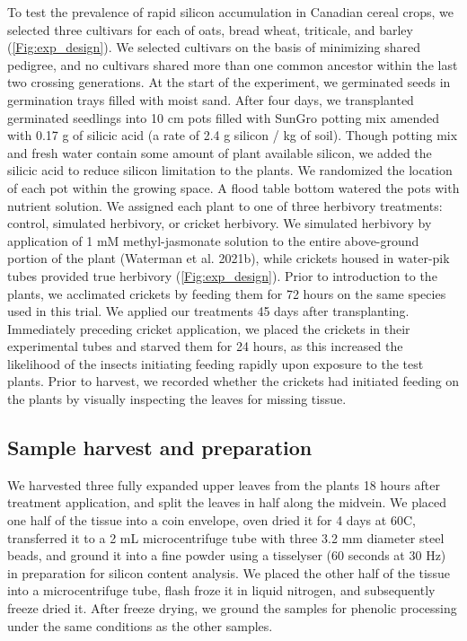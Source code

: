 \documentclass[12pt, letterpaper, ]{report}
\begin{document}
To test the prevalence of rapid silicon accumulation in Canadian cereal crops, we selected three cultivars for each of oats, bread wheat, triticale, and barley (\ref{Fig:exp_design}). We selected cultivars on the basis of minimizing shared pedigree, and no cultivars shared more than one common ancestor within the last two crossing generations. At the start of the experiment, we germinated seeds in germination trays filled with moist sand. After four days, we transplanted germinated seedlings into 10 cm pots filled with SunGro potting mix amended with 0.17 g of silicic acid (a rate of 2.4 g silicon / kg of soil). Though potting mix and fresh water contain some amount of plant available silicon, we added the silicic acid to reduce silicon limitation to the plants. We randomized the location of each pot within the growing space. A flood table bottom watered the pots with nutrient solution. We assigned each plant to one of three herbivory treatments: control, simulated herbivory, or cricket herbivory. We simulated herbivory by application of 1 mM methyl-jasmonate solution to the entire above-ground portion of the plant (Waterman et al. 2021b), while crickets housed in water-pik tubes provided true herbivory (\ref{Fig:exp_design}). Prior to introduction to the plants, we acclimated crickets by feeding them for 72 hours on the same species used in this trial. We applied our treatments 45 days after transplanting. Immediately preceding cricket application, we placed the crickets in their experimental tubes and starved them for 24 hours, as this increased the likelihood of the insects initiating feeding rapidly upon exposure to the test plants. Prior to harvest, we recorded whether the crickets had initiated feeding on the plants by visually inspecting the leaves for missing tissue. 

\subsection{Sample harvest and preparation}

We harvested three fully expanded upper leaves from the plants 18 hours after treatment application, and split the leaves in half along the midvein. We placed one half of the tissue into a coin envelope, oven dried it for 4 days at 60\degree C, transferred it to a 2 mL microcentrifuge tube with three 3.2 mm diameter steel beads, and ground it into a fine powder using a tisselyser (60 seconds at 30 Hz) in preparation for silicon content analysis. We placed the other half of the tissue into a microcentrifuge tube, flash froze it in liquid nitrogen, and subsequently freeze dried it. After freeze drying, we ground the samples for phenolic processing under the same conditions as the other samples.
\end{document}
